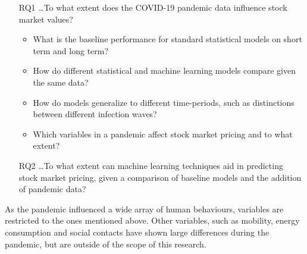 \begin{itemize}
    \item[RQ1] \ldots To what extent does the COVID-19 pandemic data influence stock market values?
        \begin{itemize}
            \item What is the baseline performance for standard statistical models on short term and long term?
            \item How do different statistical and machine learning models compare given the same data?
            \item How do models generalize to different time-periods, such as distinctions between different infection waves?
            \item Which variables in a pandemic affect stock market pricing and to what extent? %
        \end{itemize}
    \item[RQ2] \ldots To what extent can machine learning techniques aid in predicting stock market pricing, given a comparison of baseline models and the addition of pandemic data?
\end{itemize}
As the pandemic influenced a wide array of human behaviours, variables are restricted to the ones mentioned above. Other variables, such as mobility, energy consumption and social contacts have shown large differences during the pandemic, but are outside of the scope of this research.
